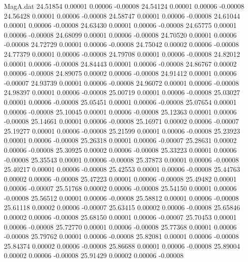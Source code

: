 \begin{filecontents}{MagA.dat}
  24.51854    0.00001    0.00006   -0.00008
  24.54124    0.00001    0.00006   -0.00008
  24.56428    0.00001    0.00006   -0.00008
  24.58747    0.00001    0.00006   -0.00008
  24.61044    0.00001    0.00006   -0.00008
  24.63430    0.00001    0.00006   -0.00008
  24.65775    0.00001    0.00006   -0.00008
  24.68099    0.00001    0.00006   -0.00008
  24.70520    0.00001    0.00006   -0.00008
  24.72729    0.00001    0.00006   -0.00008
  24.75042    0.00002    0.00006   -0.00008
  24.77379    0.00001    0.00006   -0.00008
  24.79708    0.00001    0.00006   -0.00008
  24.82012    0.00001    0.00006   -0.00008
  24.84443    0.00001    0.00006   -0.00008
  24.86767    0.00002    0.00006   -0.00008
  24.89075    0.00002    0.00006   -0.00008
  24.91412    0.00001    0.00006   -0.00007
  24.93739    0.00001    0.00006   -0.00008
  24.96072    0.00001    0.00006   -0.00008
  24.98397    0.00001    0.00006   -0.00008
  25.00719    0.00001    0.00006   -0.00008
  25.03027    0.00001    0.00006   -0.00008
  25.05451    0.00001    0.00006   -0.00008
  25.07654    0.00001    0.00006   -0.00008
  25.10045    0.00001    0.00006   -0.00008
  25.12363    0.00001    0.00006   -0.00008
  25.14661    0.00001    0.00006   -0.00008
  25.16971    0.00002    0.00006   -0.00007
  25.19277    0.00001    0.00006   -0.00008
  25.21599    0.00001    0.00006   -0.00008
  25.23923    0.00001    0.00006   -0.00008
  25.26318    0.00001    0.00006   -0.00007
  25.28631    0.00002    0.00006   -0.00008
  25.30925    0.00002    0.00006   -0.00008
  25.33223    0.00001    0.00006   -0.00008
  25.35543    0.00001    0.00006   -0.00008
  25.37873    0.00001    0.00006   -0.00008
  25.40217    0.00001    0.00006   -0.00008
  25.42553    0.00001    0.00006   -0.00008
  25.44763    0.00002    0.00006   -0.00008
  25.47223    0.00001    0.00006   -0.00008
  25.49482    0.00001    0.00006   -0.00007
  25.51768    0.00002    0.00006   -0.00008
  25.54150    0.00001    0.00006   -0.00008
  25.56512    0.00001    0.00006   -0.00008
  25.58812    0.00001    0.00006   -0.00008
  25.61118    0.00002    0.00006   -0.00007
  25.63415    0.00002    0.00006   -0.00008
  25.65846    0.00002    0.00006   -0.00008
  25.68150    0.00001    0.00006   -0.00007
  25.70453    0.00001    0.00006   -0.00008
  25.72770    0.00001    0.00006   -0.00008
  25.77368    0.00001    0.00006   -0.00008
  25.79762    0.00001    0.00006   -0.00008
  25.82081    0.00001    0.00006   -0.00008
  25.84374    0.00002    0.00006   -0.00008
  25.86688    0.00001    0.00006   -0.00008
  25.89004    0.00002    0.00006   -0.00008
  25.91429    0.00002    0.00006   -0.00008

\end{filecontents}
